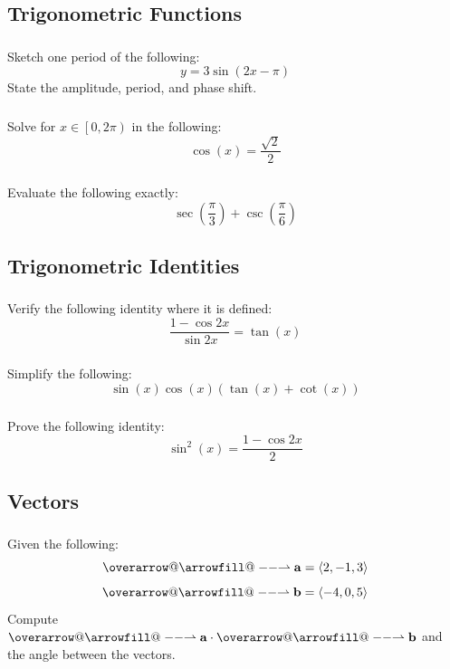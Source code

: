 \documentclass[12pt]{article}
\makeatletter
\newcommand*{\overrightharpoonup}{\mathpalette{\overarrow@\rightharpoonupfill@}}
\newcommand*{\rightharpoonupfill@}{\arrowfill@\relbar\relbar\rightharpoonup}
\renewcommand{\vec}[1]{\overrightharpoonup{\bm{\mathrm{#1}}}}
\makeatother
\begin{document}
		\subsection{Trigonometric Functions}
			\subsubsection{}
				Sketch one period of the following:
				\[y=3\sin(2x-\pi)\]
				State the amplitude, period, and phase shift.
			\subsubsection{}
				Solve for \(x\in\left[0,2\pi\right)\) in the following:
				\[\cos\left(x\right)=\frac{\sqrt{2}}{2}\]
			\subsubsection{}
				Evaluate the following exactly:
				\[\sec\left(\frac{\pi}{3}\right)+\csc\left(\frac{\pi}{6}\right)\]

		\subsection{Trigonometric Identities}
			\subsubsection{}
				Verify the following identity where it is defined:
				\[\frac{1-\cos 2x}{\sin 2x}=\tan\left(x\right)\]
			\subsubsection{}
				Simplify the following:
				\[\sin\left(x\right)\cos\left(x\right)\left(\tan\left(x\right)+\cot\left(x\right)\right)\]
			\subsubsection{}
				Prove the following identity:
				\[\sin^2\left(x\right)=\frac{1-\cos 2x}{2}\]

		\subsection{Vectors}
			\subsubsection{}
				Given the following:
				\[\vec{a}=\langle 2,-1,3\rangle\]
				\[\vec{b}=\langle-4,0,5\rangle\]
				Compute \(\vec{a}\cdot\vec{b}\) and the angle between the vectors.
\end{document}
